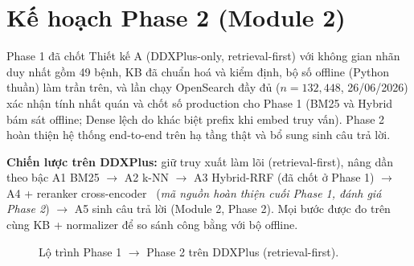 
\section{Kế hoạch Phase 2 (Module 2)}
\label{sec:phase2}

Phase 1 đã chốt Thiết kế A (DDXPlus-only, retrieval-first) với không gian nhãn duy nhất gồm 49 bệnh, KB đã chuẩn hoá và kiểm định, bộ số offline (Python thuần) làm trần trên, và lần chạy OpenSearch đầy đủ ($n=132{,}448$, 26/06/2026) xác nhận tính nhất quán và chốt số production cho Phase 1 (BM25 và Hybrid bám sát offline; Dense lệch do khác biệt prefix khi embed truy vấn). Phase 2 hoàn thiện hệ thống end-to-end trên hạ tầng thật và bổ sung sinh câu trả lời.

\textbf{Chiến lược trên DDXPlus:} giữ truy xuất làm lõi (retrieval-first), nâng dần theo bậc A1 BM25 $\rightarrow$ A2 k-NN $\rightarrow$ A3 Hybrid-RRF (đã chốt ở Phase 1) $\rightarrow$ A4 + reranker cross-encoder~\cite{nogueira2019bert} (\textit{mã nguồn hoàn thiện cuối Phase 1, đánh giá Phase 2}) $\rightarrow$ A5 sinh câu trả lời (Module 2, Phase 2). Mọi bước được đo trên cùng KB + normalizer để so sánh công bằng với bộ offline.

\begin{figure}[H]
    \centering
    \caption{Lộ trình Phase 1 $\rightarrow$ Phase 2 trên DDXPlus (retrieval-first).}
    \label{fig:roadmap}
\end{figure}

